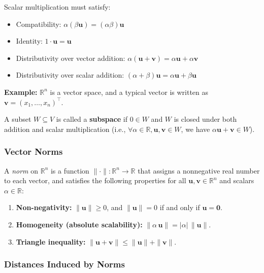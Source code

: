 \vspace{1em}
\noindent
Scalar multiplication must satisfy:
\begin{itemize}
    \item Compatibility: $\alpha(\beta \mathbf{u}) = (\alpha\beta) \mathbf{u}$
    \item Identity: $1 \cdot \mathbf{u} = \mathbf{u}$
    \item Distributivity over vector addition: $\alpha(\mathbf{u} + \mathbf{v}) = \alpha \mathbf{u} + \alpha \mathbf{v}$
    \item Distributivity over scalar addition: $(\alpha + \beta)\mathbf{u} = \alpha \mathbf{u} + \beta \mathbf{u}$
\end{itemize}

\noindent
\textbf{Example:} $\mathbb{R}^n$ is a vector space, and a typical vector is written as $\mathbf{v} = (x_1, \dots, x_n)^\top$.

\vspace{1em}
\noindent
A subset $W \subseteq V$ is called a \textbf{subspace} if $0 \in W$ and $W$ is closed under both addition and scalar multiplication (i.e., $\forall \alpha \in \mathbb{R}, \mathbf{u}, \mathbf{v} \in W$, we have $\alpha \mathbf{u} + \mathbf{v} \in W$).




\subsubsection{Vector Norms}

A \emph{norm} on $\mathbb{R}^n$ is a function $\|\cdot\| : \mathbb{R}^n \to \mathbb{R}$ 
that assigns a nonnegative real number to each vector, and satisfies the 
following properties for all $\mathbf{u}, \mathbf{v} \in \mathbb{R}^n$ 
and scalars $\alpha \in \mathbb{R}$:
\begin{enumerate}
\item \textbf{Non-negativity:} $\|\mathbf{u}\| \ge 0$, and $\|\mathbf{u}\| = 0$ if and only if $\mathbf{u} = \mathbf{0}$.
\item \textbf{Homogeneity (absolute scalability):} $\|\alpha\,\mathbf{u}\| = |\alpha| \,\|\mathbf{u}\|$.
\item \textbf{Triangle inequality:} $\|\mathbf{u} + \mathbf{v}\| \le \|\mathbf{u}\| + \|\mathbf{v}\|$.
\end{enumerate}

\subsubsection{Distances Induced by Norms}


